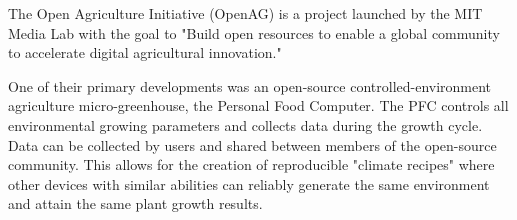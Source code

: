 


The Open Agriculture Initiative (OpenAG) is a project launched by the MIT Media Lab with the goal to "Build open resources to enable a global community to accelerate digital agricultural innovation." 

One of their primary developments was an open-source controlled-environment agriculture micro-greenhouse, the Personal Food Computer.
The PFC controls all environmental growing parameters and collects data during the growth cycle.
Data can be collected by users and shared between members of the open-source community.
This allows for the creation of reproducible "climate recipes" where other devices with similar abilities can reliably generate the same environment and attain the same plant growth results.


